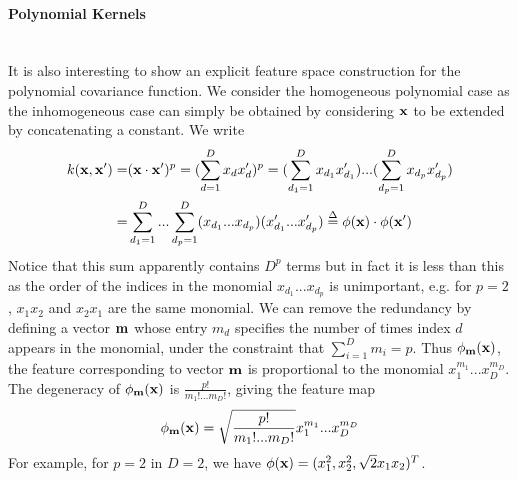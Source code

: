 \documentclass[11pt]{article}
\begin{document}
\paragraph{Polynomial Kernels}\mbox{}\\
It is also interesting to show an explicit feature space construction for the polynomial covariance function. We consider the homogeneous polynomial case as the inhomogeneous case can simply be obtained by considering ${\bf x}$ to be extended by concatenating a constant. We write
\begin{align*}
k({\bf x}, {\bf x}')=&({\bf x} \cdot {\bf x}')^p=(\sum_{d=1}^D x_d x'_d)^p=(\sum_{d_1=1}^D x_{d_1} x'_{d_1})...(\sum_{d_p=1}^D x_{d_p} x'_{d_p})\\
=&\sum_{d_1=1}^D...\sum_{d_p=1}^D(x_{d_1}...x_{d_p})(x'_{d_1}...x'_{d_p})\overset{\Delta}=\phi({\bf x})\cdot \phi({\bf x}')
\end{align*}
Notice that this sum apparently contains $D^p$ terms but in fact it is less than this as the order of the indices in the monomial $x_{d_1}...x_{d_p}$ is unimportant, e.g. for $p=2$, $x_1x_2$ and $x_2x_1$ are the same monomial. We can remove the redundancy by defining a vector ${\bf m}$ whose entry $m_d$ specifies the number of times index $d$ appears in the monomial, under the constraint that $\sum_{i=1}^D m_i=p$. Thus $\phi_{\bf m}({\bf x})$, the feature corresponding to vector ${\bf m}$ is proportional to the monomial $x_1^{m_1}...x_D^{m_D}$. The degeneracy of $\phi_{\bf m}({\bf x})$ is $\frac{p!}{m_1!...m_D!}$, giving the feature map
\begin{align*}
\phi_{\bf m}({\bf x})=\sqrt{\frac{p!}{m_1!...m_D!}}x_1^{m_1}...x_D^{m_D}
\end{align*}
For example, for $p=2$ in $D=2$, we have $\phi({\bf x})=(x_1^2, x_2^2, \sqrt{2}x_1x_2)^T$.
\end{document}
